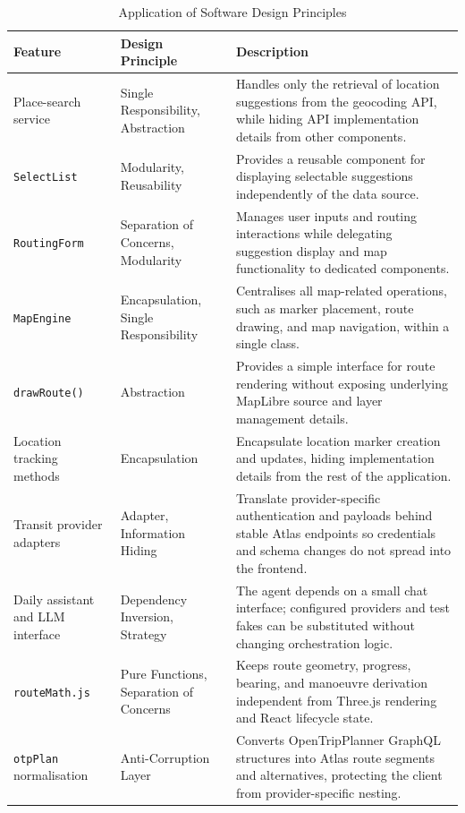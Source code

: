 \documentclass[11pt]{article}
\begin{document}
\begin{table}[H]
\centering
\caption{Application of Software Design Principles}
\label{tab:design_principles}
\small
\begin{tabular}{|p{3cm}|p{4cm}|p{7cm}|}
\hline
\textbf{Feature} & \textbf{Design Principle} & \textbf{Description} \\
\hline
Place-search service &
Single Responsibility, Abstraction &
Handles only the retrieval of location suggestions from the geocoding API, while hiding API implementation details from other components. \\
\hline
\texttt{SelectList} &
Modularity, Reusability &
Provides a reusable component for displaying selectable suggestions independently of the data source. \\
\hline
\texttt{RoutingForm} &
Separation of Concerns, Modularity &
Manages user inputs and routing interactions while delegating suggestion display and map functionality to dedicated components. \\
\hline
\texttt{MapEngine} &
Encapsulation, Single Responsibility &
Centralises all map-related operations, such as marker placement, route drawing, and map navigation, within a single class. \\
\hline
\texttt{drawRoute()} &
Abstraction &
Provides a simple interface for route rendering without exposing underlying MapLibre source and layer management details. \\
\hline
Location tracking methods &
Encapsulation &
Encapsulate location marker creation and updates, hiding implementation details from the rest of the application. \\
\hline
Transit provider adapters &
Adapter, Information Hiding &
Translate provider-specific authentication and payloads behind stable Atlas endpoints so credentials and schema changes do not spread into the frontend. \\
\hline
Daily assistant and LLM interface &
Dependency Inversion, Strategy &
The agent depends on a small chat interface; configured providers and test fakes can be substituted without changing orchestration logic. \\
\hline
\texttt{routeMath.js} &
Pure Functions, Separation of Concerns &
Keeps route geometry, progress, bearing, and manoeuvre derivation independent from Three.js rendering and React lifecycle state. \\
\hline
\texttt{otpPlan} normalisation &
Anti-Corruption Layer &
Converts OpenTripPlanner GraphQL structures into Atlas route segments and alternatives, protecting the client from provider-specific nesting. \\
\hline
\end{tabular}
\normalsize
\end{table}
\end{document}
